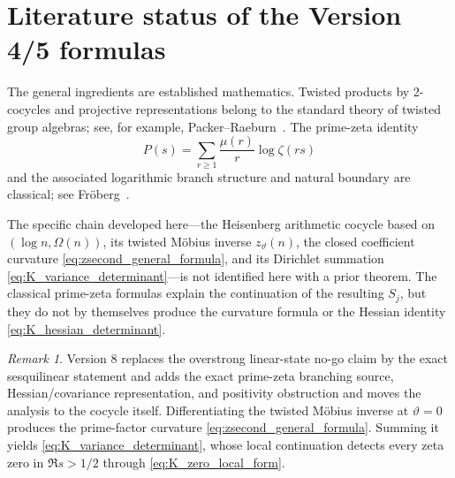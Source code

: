 \documentclass[11pt]{amsart}
\numberwithin{equation}{section}
\theoremstyle{plain}
\theoremstyle{definition}
\theoremstyle{remark}
\newtheorem{remark}[theorem]{Remark}
\begin{document}
\section{Literature status of the Version 4/5 formulas}
\label{sec:literature_status_v5}

The general ingredients are established mathematics.  Twisted products by
2-cocycles and projective representations belong to the standard theory of
twisted group algebras; see, for example, Packer--Raeburn~\cite{PackerRaeburn1992}.
The prime-zeta identity
\begin{equation}
P(s)=\sum_{r\ge1}\frac{\mu(r)}r\log\zeta(rs)
\label{eq:literature_prime_zeta_identity}
\end{equation}
and the associated logarithmic branch structure and natural boundary are
classical; see Fr\"oberg~\cite{Froberg1968}.

The specific chain developed here---the Heisenberg arithmetic cocycle based on
\((\log n,\Omega(n))\), its twisted M\"obius inverse \(z_\vartheta(n)\), the
closed coefficient curvature
\eqref{eq:zsecond_general_formula}, and its Dirichlet summation
\eqref{eq:K_variance_determinant}---is not identified here with a prior theorem.
The classical prime-zeta formulas explain the continuation of the resulting
\(S_j\), but they do not by themselves produce the curvature formula or the
Hessian identity \eqref{eq:K_hessian_determinant}.

\begin{remark}
\label{rem:history_v5}
Version 8 replaces the overstrong linear-state no-go claim by the exact sesquilinear statement and adds the exact prime-zeta branching source, Hessian/covariance representation, and positivity obstruction and moves the analysis to
the cocycle itself. Differentiating the twisted M\"obius inverse at
\(\vartheta=0\) produces the prime-factor curvature
\eqref{eq:zsecond_general_formula}. Summing it yields
\eqref{eq:K_variance_determinant}, whose local continuation detects every
zeta zero in \(\Re s>1/2\) through \eqref{eq:K_zero_local_form}.
\end{remark}
\end{document}
